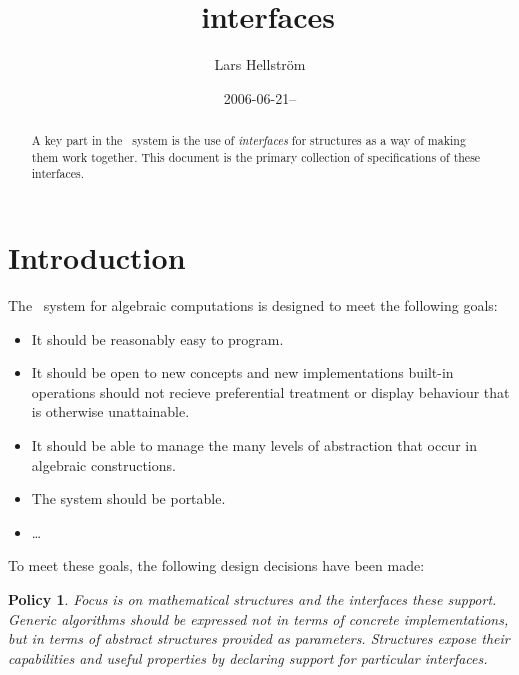 \documentclass{mtmtcl}
\theoremstyle{plain}
\newtheorem{policy}{Policy}
\theoremstyle{remark}
\begin{document}
\title{\mtl~interfaces}
\author{Lars Hellstr\"om}
\date{2006-06-21--}
\maketitle


\begin{abstract}
  A key part in the \mtl\ system is the use of \emph{interfaces} 
  for structures as a way of making them work together. This 
  document is the primary collection of specifications of these 
  interfaces.
\end{abstract}

\tableofcontents


\section{Introduction}

The \mtl\ system for algebraic computations is designed to meet the 
following goals:
\begin{itemize}
  \item
    It should be reasonably easy to program. 
    \iffalse
    and in particular not 
    constantly burden the mathematician's mind with issues of how 
    data is being stored.
    \fi
  \item
    It should be open to new concepts and new implementations\Dash 
    built-in operations should not recieve preferential treatment or 
    display behaviour that is otherwise unattainable.
  \item
    It should be able to manage the many levels of abstraction that 
    occur in algebraic constructions.
  \item
    The system should be portable.
  \item
    \dots
\end{itemize}
To meet these goals, the following design decisions have been made:

\begin{policy} \label{Pol:Strukturer}
  Focus is on mathematical \emph{structures} and the \emph{interfaces} 
  these support. Generic algorithms should be expressed not in terms 
  of concrete implementations, but in terms of abstract structures 
  provided as parameters. Structures expose their capabilities and 
  useful properties by declaring support for particular interfaces.
\end{policy}
\end{document}
